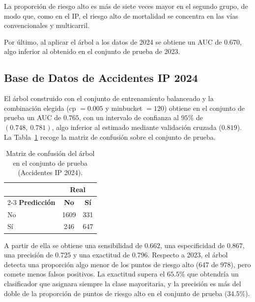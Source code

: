\documentclass[twoside,a4paper,12pt,onecolumn,openany]{book}
\begin{document}
La proporción de riesgo alto es más de siete veces mayor en el segundo grupo, de modo que, como en el IP, el riesgo alto de mortalidad se concentra en las vías convencionales y multicarril.
 
\vspace{0.5cm}
 
Por último, al aplicar el árbol a los datos de 2024 se obtiene un AUC de $0.670$, algo inferior al obtenido en el conjunto de prueba de 2023.
 
\subsection{Base de Datos de Accidentes IP 2024}
 
El árbol construido con el conjunto de entrenamiento balanceado y la combinación elegida (cp $=0.005$ y minbucket $=120$) obtiene en el conjunto de prueba un AUC de $0.765$, con un intervalo de confianza al $95\%$ de $(0.748,\ 0.781)$, algo inferior al estimado mediante validación cruzada ($0.819$). La Tabla~\ref{tab:confusion_acc_ip_2024} recoge la matriz de confusión sobre el conjunto de prueba.
 
\begin{table}[H]
    \centering
    \vspace{0.3cm}
    \renewcommand{\arraystretch}{1.3}
    \begin{tabular}{lcc}
        \toprule
        & \multicolumn{2}{c}{\textbf{Real}} \\
        \cmidrule(lr){2-3}
        \textbf{Predicción} & \textbf{No} & \textbf{Sí} \\
        \midrule
        No & 1609 & 331 \\
        Sí & 246  & 647 \\
        \bottomrule
    \end{tabular}
    \caption{Matriz de confusión del árbol en el conjunto de prueba (Accidentes IP 2024).}
    \label{tab:confusion_acc_ip_2024}
\end{table}
 
\vspace{0.5cm}
 
A partir de ella se obtiene una sensibilidad de $0.662$, una especificidad de $0.867$, una precisión de $0.725$ y una exactitud de $0.796$. Respecto a 2023, el árbol detecta una proporción algo menor de los puntos de riesgo alto (647 de 978), pero comete menos falsos positivos. La exactitud supera el $65.5\%$ que obtendría un clasificador que asignara siempre la clase mayoritaria, y la precisión es más del doble de la proporción de puntos de riesgo alto en el conjunto de prueba ($34.5\%$).
 
\end{document}
